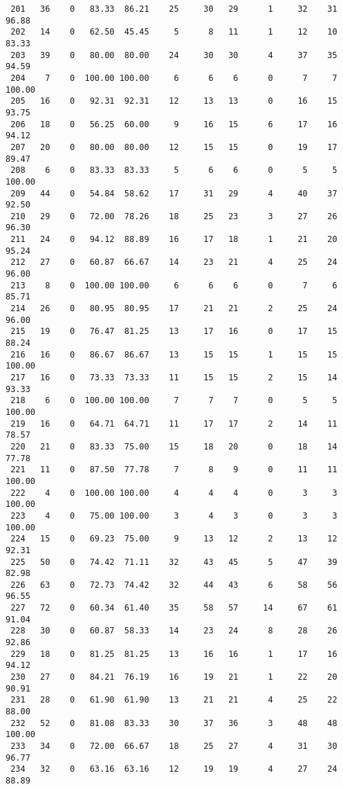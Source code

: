 \begin{verbatim}
 201   36    0   83.33  86.21    25     30   29      1     32    31    96.88
 202   14    0   62.50  45.45     5      8   11      1     12    10    83.33
 203   39    0   80.00  80.00    24     30   30      4     37    35    94.59
 204    7    0  100.00 100.00     6      6    6      0      7     7   100.00
 205   16    0   92.31  92.31    12     13   13      0     16    15    93.75
 206   18    0   56.25  60.00     9     16   15      6     17    16    94.12
 207   20    0   80.00  80.00    12     15   15      0     19    17    89.47
 208    6    0   83.33  83.33     5      6    6      0      5     5   100.00
 209   44    0   54.84  58.62    17     31   29      4     40    37    92.50
 210   29    0   72.00  78.26    18     25   23      3     27    26    96.30
 211   24    0   94.12  88.89    16     17   18      1     21    20    95.24
 212   27    0   60.87  66.67    14     23   21      4     25    24    96.00
 213    8    0  100.00 100.00     6      6    6      0      7     6    85.71
 214   26    0   80.95  80.95    17     21   21      2     25    24    96.00
 215   19    0   76.47  81.25    13     17   16      0     17    15    88.24
 216   16    0   86.67  86.67    13     15   15      1     15    15   100.00
 217   16    0   73.33  73.33    11     15   15      2     15    14    93.33
 218    6    0  100.00 100.00     7      7    7      0      5     5   100.00
 219   16    0   64.71  64.71    11     17   17      2     14    11    78.57
 220   21    0   83.33  75.00    15     18   20      0     18    14    77.78
 221   11    0   87.50  77.78     7      8    9      0     11    11   100.00
 222    4    0  100.00 100.00     4      4    4      0      3     3   100.00
 223    4    0   75.00 100.00     3      4    3      0      3     3   100.00
 224   15    0   69.23  75.00     9     13   12      2     13    12    92.31
 225   50    0   74.42  71.11    32     43   45      5     47    39    82.98
 226   63    0   72.73  74.42    32     44   43      6     58    56    96.55
 227   72    0   60.34  61.40    35     58   57     14     67    61    91.04
 228   30    0   60.87  58.33    14     23   24      8     28    26    92.86
 229   18    0   81.25  81.25    13     16   16      1     17    16    94.12
 230   27    0   84.21  76.19    16     19   21      1     22    20    90.91
 231   28    0   61.90  61.90    13     21   21      4     25    22    88.00
 232   52    0   81.08  83.33    30     37   36      3     48    48   100.00
 233   34    0   72.00  66.67    18     25   27      4     31    30    96.77
 234   32    0   63.16  63.16    12     19   19      4     27    24    88.89

\end{verbatim}
